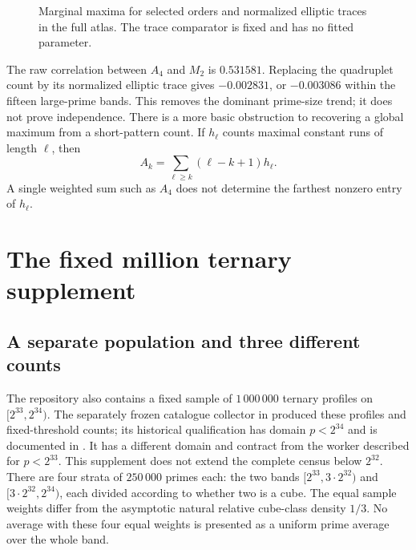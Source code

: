 \documentclass[11pt]{article}
\theoremstyle{definition}\newtheorem{definition}[theorem]{Definition}
\begin{document}
\begin{figure}[htbp]
\caption{Marginal maxima for selected orders and normalized elliptic traces in the full atlas. The trace comparator is fixed and has no fitted parameter.}\label{fig:atlas}
\end{figure}

The raw correlation between $A_4$ and $M_2$ is $0.531581$. Replacing
the quadruplet count by its normalized elliptic trace gives
$-0.002831$, or $-0.003086$ within the fifteen large-prime bands.
This removes the dominant prime-size trend; it does not prove
independence. There is a more basic obstruction to recovering a global
maximum from a short-pattern count. If $h_\ell$ counts maximal constant
runs of length $\ell$, then
\[
 A_k=\sum_{\ell\ge k}(\ell-k+1)h_\ell.
\]
A single weighted sum such as $A_4$ does not determine the farthest
nonzero entry of $h_\ell$.

\section{The fixed million ternary supplement}\label{sec:ternary}
\subsection{A separate population and three different counts}
The repository also contains a fixed sample of $1\,000\,000$
ternary profiles on $[2^{33},2^{34})$. The separately frozen catalogue
collector in  produced these profiles and
fixed-threshold counts; its historical qualification has domain $p<2^{34}$
and is documented in . It has a
different domain and contract from the worker described for $p<2^{33}$.
This supplement does not extend the complete census below $2^{32}$.
There are four strata of $250\,000$ primes each: the two
bands $[2^{33},3\cdot2^{32})$ and
$[3\cdot2^{32},2^{34})$, each divided according to whether
two is a cube. The equal sample weights differ from the
asymptotic natural relative cube-class density $1/3$.
No average with these four equal weights is presented as
a uniform prime average over the whole band.
\end{document}
